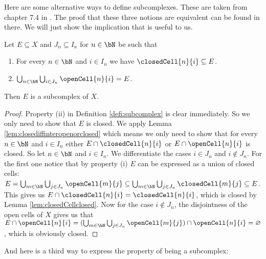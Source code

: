 Here are some alternative ways to define subcomplexes. 
These are taken from chapter 7.4 in \cite{Jänich2001}.
The proof that these three notions are equivalent can be found in there. 
We will just show the implication that is useful to us. 

\begin{lem} \label{lem:subcomplex2}
    Let $E \subseteq X$ and $J_n \subseteq I_n$ for $n \in \bN$ be such that 
    \begin{enumerate}
        \item For every $n \in \bN$ and $i \in I_n$ we have $\closedCell{n}{i} \subseteq E$. 
        \item $\bigcup_{n \in \bN} \bigcup_{i \in J_n} \openCell{n}{i} = E$.
    \end{enumerate}
    Then $E$ is a subcomplex of $X$.
    \href{https://github.com/scholzhannah/CWComplexes/blob/7be4872a05b534011cc969eb5b80a4b7f0bf57e2/CWcomplexes/subcomplex.lean#L82-L89}{\faExternalLink}
\end{lem}
\begin{proof}
    Property (ii) in Definition \ref{defi:subcomplex} is clear immediately. 
    So we only need to show that $E$ is closed. 
    We apply Lemma \ref{lem:closediffinteropenorclosed} which means we only need to show that for every $n \in \bN$ and $i \in I_n$ either $E \cap \closedCell{n}{i}$ or $E \cap \openCell{n}{i}$ is closed. 
    So let $n \in \bN$ and $i \in I_n$. 
    We differentiate the cases $i \in J_n$ and $i \notin J_n$.
    For the first one notice that by property (i) $E$ can be expressed as a union of closed cells: $E = \bigcup_{m \in \bN} \bigcup_{j \in J_n} \openCell{m}{j} \subseteq \bigcup_{m \in \bN} \bigcup_{j \in J_n} \closedCell{m}{j} \subseteq E$. 
    This gives us $E \cap \closedCell{n}{i} = \closedCell{n}{i}$, which is closed by Lemma \ref{lem:closedCellclosed}. 
    Now for the case $i \notin J_n$, the disjointness of the open cells of $X$ gives us that $E \cap \openCell{n}{i} = (\bigcup_{m \in \bN} \bigcup_{j \in J_n} \openCell{m}{j}) \cap \openCell{n}{i} = \varnothing$, which is obviously closed. 
\end{proof}

And here is a third way to express the property of being a subcomplex:

